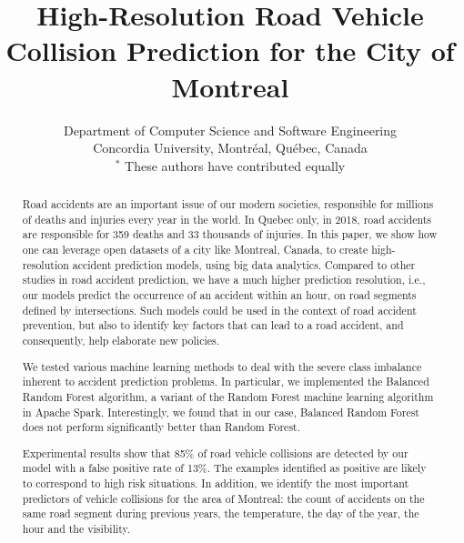 \documentclass[conference]{IEEEtran}
\begin{document}
\title{High-Resolution Road Vehicle Collision Prediction for the City of Montreal}
\author{
Department of Computer Science and Software Engineering \\
Concordia University, Montréal, Québec, Canada\\
$^*$ These authors have contributed equally

}

\maketitle

\begin{abstract}

Road accidents are an important issue of our modern societies, responsible
for millions of deaths and injuries every year in the world. In Quebec only,
in 2018, road accidents are responsible for 359 deaths and 33 thousands of injuries.
In this paper, we show how one can leverage open datasets of a city like
Montreal, Canada, to create high-resolution accident prediction models, using
big data analytics.
Compared to other studies in road accident prediction, we have a much higher
prediction resolution, i.e., our models predict the occurrence of an accident
within an hour, on road segments defined by intersections.
Such models could be used in the context of road accident prevention, but also
to identify key factors that can lead to a road accident, and consequently, help
elaborate new policies.

We tested various machine learning methods to deal with the severe class imbalance inherent
to accident prediction problems. In particular, we implemented the Balanced Random Forest algorithm, a variant
of the Random Forest machine learning algorithm in Apache Spark. 
Interestingly, we found that in our case,
Balanced Random Forest does not perform significantly better than Random Forest.

Experimental results show that 85\% of road vehicle collisions are detected by our model with a false positive rate of 13\%. The examples identified as positive are likely to correspond to high risk situations.
In addition, we identify the most important predictors of vehicle collisions for the area of Montreal: the count of accidents on the same road segment during previous years, the temperature, the day of the year, the hour and the visibility.

\end{abstract}
\end{document}
